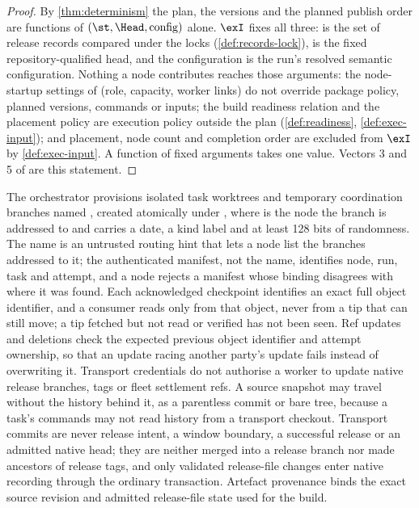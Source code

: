 \begin{proof}
By \cref{thm:determinism} the plan, the versions and the planned publish
order are functions of $(\st, \Head, \mathrm{config})$ alone. $\exI$ fixes all
three: \st{} is the set of release records compared under the locks
(\cref{def:records-lock}), \Head{} is the fixed repository-qualified head, and
the configuration is the run's resolved semantic configuration. Nothing a node
contributes reaches those arguments: the node-startup settings of 
(role, capacity, worker links) do not override package policy, planned
versions, commands or inputs; the build readiness relation and the placement
policy are execution policy outside the plan (\cref{def:readiness},
\cref{def:exec-input}); and placement, node count and completion order are
excluded from $\exI$ by \cref{def:exec-input}. A function of fixed arguments
takes one value. Vectors 3 and 5 of  are this statement.
\end{proof}

\begin{definition}
\label{def:exec-branches}
The orchestrator provisions isolated task worktrees and temporary coordination
branches named , created atomically under
, where  is the node the branch is addressed to
and  carries a date, a kind label and at least 128 bits of
randomness. The name is an untrusted routing hint that lets a node list the
branches addressed to it; the authenticated manifest, not the name,
identifies node, run, task and attempt, and a node rejects a manifest whose
binding disagrees with where it was found. Each acknowledged checkpoint
identifies an exact full object identifier, and a consumer reads only from
that object, never from a tip that can still move; a tip fetched but not read
or verified has not been seen. Ref updates and deletions check the expected
previous object identifier and attempt ownership, so that an update racing
another party's update fails instead of overwriting it. Transport credentials
do not authorise a worker to update native release branches, tags or fleet
settlement refs. A source snapshot may travel without the history behind it,
as a parentless commit or bare tree, because a task's commands may not read
history from a transport checkout. Transport commits are never release intent,
a window boundary, a successful release or an admitted native head; they are
neither merged into a release branch nor made ancestors of release tags, and
only validated release-file changes enter native recording through the
ordinary transaction. Artefact provenance binds the exact source revision and
admitted release-file state used for the build.
\end{definition}

